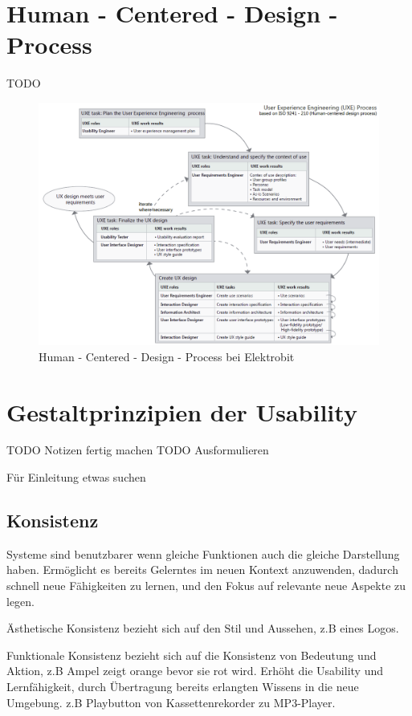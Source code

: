 \section{Human - Centered - Design - Process}
TODO

\begin{figure} [!h]
\begin{center}
  \includegraphics[width=\textwidth]{figures/HCD.png}
  \caption{Human - Centered - Design - Process bei Elektrobit}
  \label{fig:HCD}
\end{center}
\end{figure}

\section{Gestaltprinzipien der Usability}
TODO Notizen fertig machen
TODO Ausformulieren

\cite{Norman.2016} Für Einleitung etwas suchen

\subsection{Konsistenz}
Systeme sind benutzbarer wenn gleiche Funktionen auch die gleiche Darstellung haben.
Ermöglicht es bereits Gelerntes im neuen Kontext anzuwenden, dadurch schnell neue Fähigkeiten zu lernen, und den Fokus auf relevante neue Aspekte zu legen.

Ästhetische Konsistenz bezieht sich auf den Stil und Aussehen, z.B eines Logos. 

Funktionale Konsistenz bezieht sich auf die Konsistenz von Bedeutung und Aktion, z.B Ampel zeigt orange bevor sie rot wird. Erhöht die Usability und Lernfähigkeit, durch Übertragung bereits erlangten Wissens in die neue Umgebung. z.B Playbutton von Kassettenrekorder zu MP3-Player.

